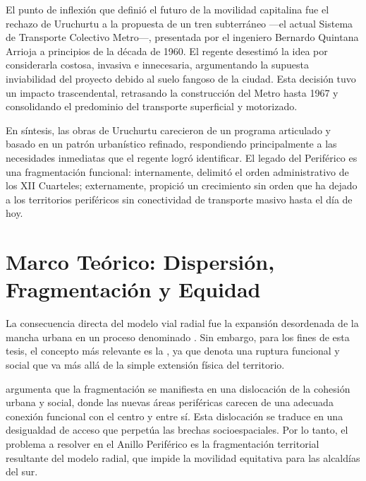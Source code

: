 El punto de inflexión que definió el futuro de la movilidad capitalina fue el
rechazo
de Uruchurtu a la propuesta de un tren subterráneo ---el actual Sistema de
Transporte
Colectivo Metro---, presentada por el ingeniero Bernardo Quintana Arrioja a
principios
de la década de 1960. El regente desestimó la idea por considerarla costosa,
invasiva e innecesaria, argumentando la supuesta inviabilidad del proyecto
debido al
suelo fangoso de la ciudad. Esta decisión tuvo un impacto trascendental,
retrasando
la construcción del Metro hasta 1967 y consolidando el predominio del transporte
superficial y motorizado.

En síntesis, las obras de Uruchurtu carecieron de un programa articulado y
basado
en un patrón urbanístico refinado, respondiendo principalmente a las necesidades
inmediatas que el regente logró identificar. El legado del Periférico es una
fragmentación funcional: internamente, delimitó el orden administrativo de los
XII
Cuarteles; externamente, propició un crecimiento sin orden que ha dejado a los
territorios periféricos sin conectividad de transporte masivo hasta el día de
hoy.

\section{Marco Teórico: Dispersión, Fragmentación y Equidad}
\label{sec:marco-teorico-dispersion}

La consecuencia directa del modelo vial radial fue la expansión desordenada de
la
mancha urbana en un proceso denominado . Sin embargo, para
los fines de esta tesis, el concepto más relevante es la , ya que denota una ruptura funcional y social que va más allá de la
simple
extensión física del territorio.

\citet{padilla2007} argumenta que la fragmentación se manifiesta en una
dislocación
de la cohesión urbana y social, donde las nuevas áreas periféricas carecen de
una
adecuada conexión funcional con el centro y entre sí. Esta dislocación se
traduce en
una desigualdad de acceso que perpetúa las brechas socioespaciales. Por lo
tanto,
el problema a resolver en el Anillo Periférico es la fragmentación territorial
resultante
del modelo radial, que impide la movilidad equitativa para las alcaldías del
sur.

